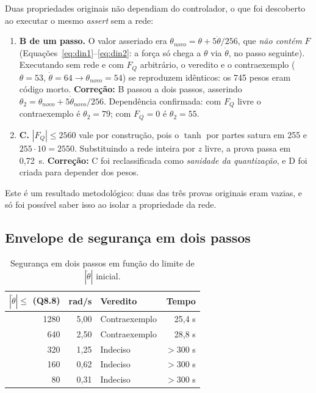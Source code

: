 \documentclass[12pt,openright,oneside,a4paper,chapter=TITLE,sumario=tradicional,english,brazil]{abntex2}
\begin{document}
Duas propriedades originais não dependiam do controlador, o que foi descoberto ao executar o mesmo \emph{assert} sem a rede:

\begin{enumerate}
  \item \textbf{B de um passo.} O valor asseriado era $\theta_{novo}=\theta+5\dot\theta/256$, que \emph{não contém} $F$ (Equações~\ref{eq:din1}--\ref{eq:din2}: a força só chega a $\theta$ via $\dot\theta$, no passo seguinte). Executando sem rede e com $F_Q$ arbitrário, o veredito e o contraexemplo ($\theta=53$, $\dot\theta=64\to\theta_{novo}=54$) se reproduzem idênticos: os 745 pesos eram código morto. \textbf{Correção:} B passou a dois passos, asserindo $\theta_2=\theta_{novo}+5\dot\theta_{novo}/256$. Dependência confirmada: com $F_Q$ livre o contraexemplo é $\theta_2=79$; com $F_Q=0$ é $\theta_2=55$.
  \item \textbf{C.} $|F_Q|\le2560$ vale por construção, pois o $\tanh$ por partes satura em 255 e $255\cdot10=2550$. Substituindo a rede inteira por $z$ livre, a prova passa em 0,72~s. \textbf{Correção:} C foi reclassificada como \emph{sanidade da quantização}, e D foi criada para depender dos pesos.
\end{enumerate}

Este é um resultado metodológico: duas das três provas originais eram vazias, e só foi possível saber isso ao isolar a propriedade da rede.

\subsection{Envelope de segurança em dois passos}\label{sec:envelope}

\begin{table}[htb]
\caption{Segurança em dois passos em função do limite de $|\dot\theta|$ inicial.}\label{tab:env}
\centering
\begin{tabular}{r|r|l|r}
\toprule
$|\dot\theta|\le$ (Q8.8) & rad/s & Veredito & Tempo \\
\midrule
1280 & 5,00 & Contraexemplo & 25,4 s \\
 640 & 2,50 & Contraexemplo & 28,8 s \\
 320 & 1,25 & Indeciso & $>$300 s \\
 160 & 0,62 & Indeciso & $>$300 s \\
  80 & 0,31 & Indeciso & $>$300 s \\
\bottomrule
\end{tabular}
\end{table}
\end{document}
